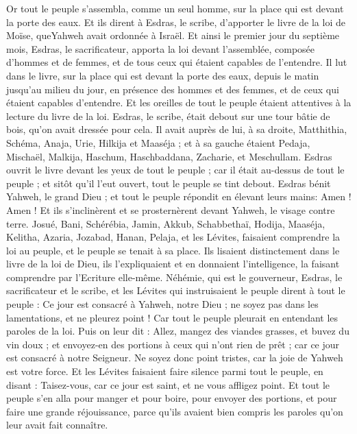 \begin{multicols}{2}
\VerseOne{}Or tout le peuple s'assembla, comme un seul homme, sur la place qui est devant la porte des eaux. Et ils dirent à Esdras, le scribe, d’apporter le livre de la loi de Moïse, queYahweh avait ordonnée à Israël.
Et ainsi le premier jour du septième mois, Esdras, le sacrificateur, apporta la loi devant l'assemblée, composée d'hommes et de femmes, et de tous ceux qui étaient capables de l’entendre.
Il lut dans le livre, sur la place qui est devant la porte des eaux, depuis le matin jusqu'au milieu du jour, en présence des hommes et des femmes, et de ceux qui étaient capables d'entendre. Et les oreilles de tout le peuple étaient attentives à la lecture du livre de la loi.
Esdras, le scribe, était debout sur une tour bâtie de bois, qu'on avait dressée pour cela. Il avait auprès de lui, à sa droite, Matthithia, Schéma, Anaja, Urie, Hilkija et Maaséja ; et à sa gauche étaient Pedaja, Mischaël, Malkija, Haschum, Haschbaddana, Zacharie, et Meschullam.
Esdras ouvrit le livre devant les yeux de tout le peuple ; car il était au-dessus de tout le peuple ; et sitôt qu'il l'eut ouvert, tout le peuple se tint debout.
Esdras bénit Yahweh, le grand Dieu ; et tout le peuple répondit en élevant leurs mains: Amen ! Amen ! Et ils s'inclinèrent et se prosternèrent devant Yahweh, le visage contre terre.
Josué, Bani, Schérébia, Jamin, Akkub, Schabbethaï, Hodija, Maaséja, Kelitha, Azaria, Jozabad, Hanan, Pelaja, et les Lévites, faisaient comprendre la loi au peuple, et le peuple se tenait à sa place.
Ils lisaient distinctement dans le livre de la loi de Dieu, ils l'expliquaient et en donnaient l'intelligence, la faisant comprendre par l'Ecriture elle-même.
Néhémie, qui est le gouverneur, Esdras, le sacrificateur et le scribe, et les Lévites qui instruisaient le peuple dirent à tout le peuple : Ce jour est consacré à Yahweh, notre Dieu ; ne soyez pas dans les lamentations, et ne pleurez point ! Car tout le peuple pleurait en entendant les paroles de la loi.
Puis on leur dit : Allez, mangez des viandes grasses, et buvez du vin doux ; et envoyez-en des portions à ceux qui n'ont rien de prêt ; car ce jour est consacré à notre Seigneur. Ne soyez donc point tristes, car la joie de Yahweh est votre force.
Et les Lévites faisaient faire silence parmi tout le peuple, en disant : Taisez-vous, car ce jour est saint, et ne vous affligez point.
Et tout le peuple s'en alla pour manger et pour boire, pour envoyer des portions, et pour faire une grande réjouissance, parce qu'ils avaient bien compris les paroles qu'on leur avait fait connaître.

\end{multicols}
